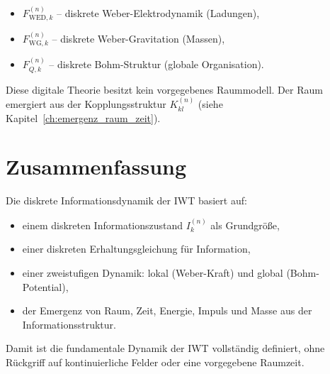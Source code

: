 \begin{itemize}
    \item \( F_{\text{WED},k}^{(n)} \) – diskrete Weber-Elektrodynamik (Ladungen),
    \item \( F_{\text{WG},k}^{(n)} \) – diskrete Weber-Gravitation (Massen),
    \item \( F_{Q,k}^{(n)} \) – diskrete Bohm-Struktur (globale Organisation).
\end{itemize}

Diese digitale Theorie besitzt kein vorgegebenes Raummodell. Der Raum emergiert aus der Kopplungsstruktur \( K_{kl}^{(n)} \) (siehe Kapitel~\ref{ch:emergenz_raum_zeit}).

\section{Zusammenfassung}
\label{sec:dynamik_zusammenfassung}

Die diskrete Informationsdynamik der IWT basiert auf:

\begin{itemize}
    \item einem diskreten Informationszustand \( I_k^{(n)} \) als Grundgröße,
    \item einer diskreten Erhaltungsgleichung für Information,
    \item einer zweistufigen Dynamik: lokal (Weber-Kraft) und global (Bohm-Potential),
    \item der Emergenz von Raum, Zeit, Energie, Impuls und Masse aus der Informationsstruktur.
\end{itemize}

Damit ist die fundamentale Dynamik der IWT vollständig definiert, ohne Rückgriff auf kontinuierliche Felder oder eine vorgegebene Raumzeit.